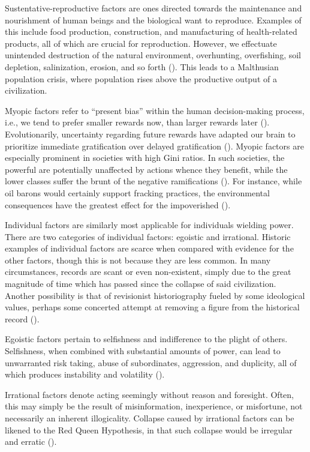 Sustentative-reproductive factors are ones directed towards the maintenance and nourishment of human beings and the biological want to reproduce. Examples of this include food production, construction, and manufacturing of health-related products, all of which are crucial for reproduction. However, we effectuate unintended destruction of the natural environment, overhunting, overfishing, soil depletion, salinization, erosion, and so forth (\cite{diamond2017youtube}). This leads to a Malthusian population crisis, where population rises above the productive output of a civilization. 

Myopic factors refer to “present bias” within the human decision-making process, i.e., we tend to prefer smaller rewards now, than larger rewards later (\cite[p.\ 1]{chakraborty2021present}). Evolutionarily, uncertainty regarding future rewards have adapted our brain to prioritize immediate gratification over delayed gratification (\cite[p.\ 1]{albrecht2013what}). Myopic factors are especially prominent in societies with high Gini ratios. In such societies, the powerful are potentially unaffected by actions whence they benefit, while the lower classes suffer the brunt of the negative ramifications (\cite{paulson2015shorttermism}). For instance, while oil barons would certainly support fracking practices, the environmental consequences have the greatest effect for the impoverished (\cite{lin2022fracking}).

Individual factors are similarly most applicable for individuals wielding power. There are two categories of individual factors: egoistic and irrational. Historic examples of individual factors are scarce when compared with evidence for the other factors, though this is not because they are less common. In many circumstances, records are scant or even non-existent, simply due to the great magnitude of time which has passed since the collapse of said civilization. Another possibility is that of revisionist historiography fueled by some ideological values, perhaps some concerted attempt at removing a figure from the historical record (\cite{burton2020akhenaten}). 

Egoistic factors pertain to selfishness and indifference to the plight of others. Selfishness, when combined with substantial amounts of power, can lead to unwarranted risk taking, abuse of subordinates, aggression, and duplicity, all of which produces instability and volatility (\cites{simmons2024narcissistic}[pp.\ 9–10]{blanton2020moral}). 

Irrational factors denote acting seemingly without reason and foresight. Often, this may simply be the result of misinformation, inexperience, or misfortune, not necessarily an inherent illogicality. Collapse caused by irrational factors can be likened to the Red Queen Hypothesis, in that such collapse would be irregular and erratic (\cite{kemp2019collapse}). 

